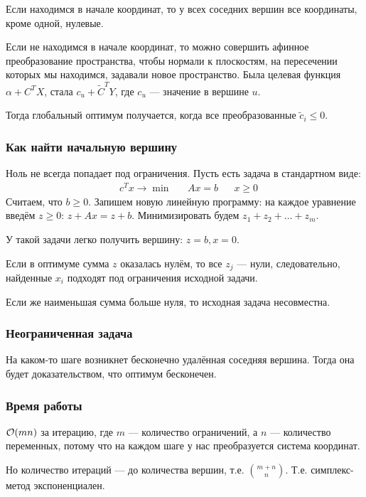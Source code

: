 Если находимся в начале координат,
то у всех соседних вершин все координаты,
кроме одной, нулевые.

Если не находимся в начале координат,
то можно совершить афинное преобразование пространства,
чтобы нормали к плоскостям,
на пересечении которых мы находимся,
задавали новое пространство.
Была целевая функция
$\alpha + C^T X$, стала $c_u + \tilde{C}^T Y$,
где $c_u$ --- значение в вершине $u$.

Тогда глобальный оптимум получается,
когда все преобразованные $\tilde{c}_i \le 0$.

\subsubsection{Как найти начальную вершину}
Ноль не всегда попадает под ограничения.
Пусть есть задача в стандартном виде:
\begin{align*}
    & c^T x \to \min
    && Ax = b
    && x \ge 0
\end{align*}
Считаем, что $b \ge 0$.
Запишем новую линейную программу:
на каждое уравнение введём $z \ge 0$:
$z + Ax = z + b$.
Минимизировать будем
$z_1 + z_2 + \ldots + z_m$.

У такой задачи легко получить
вершину: $z = b, x = 0$.

Если в оптимуме сумма $z$ оказалась нулём,
то все $z_j$ --- нули, следовательно,
найденные $x_i$ подходят под ограничения исходной задачи.

Если же наименьшая сумма больше нуля,
то исходная задача несовместна.

\subsubsection{Неограниченная задача}
На каком-то шаге возникнет
бесконечно удалённая соседняя вершина.
Тогда она будет доказательством,
что оптимум бесконечен.

\subsubsection{Время работы}
$\mathcal{O}(mn)$ за итерацию,
где $m$ --- количество ограничений,
а $n$ --- количество переменных,
потому что на каждом шаге у нас
преобразуется система координат.

Но количество итераций
--- до количества вершин,
т.е. $\binom{m + n}{n}$.
Т.е. симплекс-метод экспоненциален.
